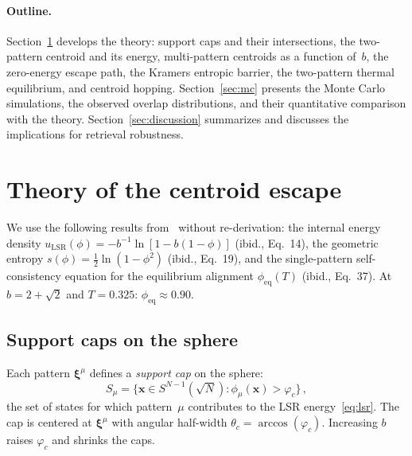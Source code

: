 \documentclass[11pt]{article}
\newcommand{\bxi}{\boldsymbol{\xi}}
\newcommand{\bx}{\mathbf{x}}
\begin{document}
\paragraph{Outline.}  Section~\ref{sec:theory} develops the theory: support caps and their intersections, the two-pattern centroid and its energy, multi-pattern centroids as a function of~$b$, the zero-energy escape path, the Kramers entropic barrier, the two-pattern thermal equilibrium, and centroid hopping.  Section~\ref{sec:mc} presents the Monte Carlo simulations, the observed overlap distributions, and their quantitative comparison with the theory.  Section~\ref{sec:discussion} summarizes and discusses the implications for retrieval robustness.

\section{Theory of the centroid escape}
\label{sec:theory}

We use the following results from~\citet{icml2026theory} without re-derivation: the internal energy density $u_{\mathrm{LSR}}(\phi) = -b^{-1}\ln[1-b(1-\phi)]$ (ibid., Eq.~14), the geometric entropy $s(\phi) = \tfrac{1}{2}\ln(1-\phi^2)$ (ibid., Eq.~19), and the single-pattern self-consistency equation for the equilibrium alignment $\phi_{\mathrm{eq}}(T)$ (ibid., Eq.~37).  At $b = 2+\sqrt{2}$ and $T = 0.325$: $\phi_{\mathrm{eq}} \approx 0.90$.

\subsection{Support caps on the sphere}
\label{ssec:caps}

Each pattern $\bxi^\mu$ defines a \emph{support cap} on the sphere:
\begin{equation}
S_\mu = \big\{\bx \in S^{N-1}(\!\sqrt{N}) : \phi_\mu(\bx) > \varphi_c\big\}\,,
\label{eq:cap}
\end{equation}
the set of states for which pattern~$\mu$ contributes to the LSR energy~\eqref{eq:lsr}.  The cap is centered at $\bxi^\mu$ with angular half-width $\theta_c = \arccos(\varphi_c)$.  Increasing $b$ raises $\varphi_c$ and shrinks the caps.
\end{document}
